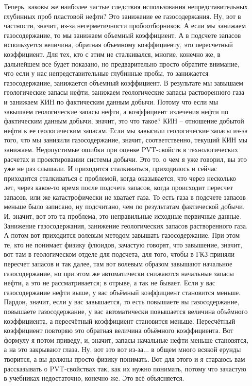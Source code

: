 \documentclass[main.tex]{subfiles}
\begin{document}
Теперь, каковы же наиболее частые следствия использования непредставительных глубинных проб пластовой нефти?
Это занижение ее газосодержания.
Ну, вот в частности, значит, из-за негерметичности пробоотборников.
А если мы занижаем газосодержание, то мы занижаем объемный коэффициент.
А в подсчете запасов используется величина, обратная объемному коэффициенту, это пересчетный коэффициент.
Для тех, кто с этим не сталкивался, многие, конечно же, в дальнейшем все будет показано, но предварительно просто обратите внимание, что если у нас непредставительные глубинные пробы, то занижается газосодержание, занижается объемный коэффициент.
В результате мы завышаем геологические запасы нефти, занижаем геологические запасы растворенного газа и занижаем КИН по фактическим данным добычи.
Потому что если мы завышаем геологические запасы нефти, а коэффициент излечения нефти по фактическим данным добычи, значит, это что такое?
КИН -- отношение добытой нефти к ее геологическим запасам.
Если мы завысили геологические запасы из-за того, что мы занизили газосодержание, значит, соответственно, текущий КИН мы занижаем.
Недопустимые ошибки при оценке PVT-свойств в технологических расчетах и проектировании системы добычи.
Это то, о чем я уже говорил, вы это уже не раз слышали.
И приходится сталкиваться, приходилось и сейчас приходится сталкиваться с проблемой, когда оказывается, что через несколько лет, через какое-то время после подсчета запасов, когда происходит пересчет запасов, или же катастрофически не хватает газа.
То есть газа в подсчете запасов меньше было записано, ну подсчитано, чем по результатам фактической добычи.
И, значит, вот это та проблема, это неправильные исходные первичные данные.
Занижение газосодержания, занижение геологических запасов растворенного газа.
А потом вот приходится волевым методом завышать газосодержание.
При этом те, кто не понимает физику флюидов, зачастую говорят, что завышение, значит, вот там в геологическом отделе для подсчета, для того, чтобы в ГКЗ приняли пересчет запасов и так далее, там вот волевым образом завышают начальное газосодержание, но при этом же автоматически снижаются начальные запасы нефти, а это не рассматривается; в отрыве, а так не бывает.
Если у вас газосодержание нефти выше, у вас объёмный коэффициент становится меньше.
Пардон, значит, если у вас завышается, то есть повышаете вы газосодержание, повышаете газосодержание, у вас автоматически повышается величина объёмного коэффициента, а пересчётный коэффициент становится меньше.
Пересчётный коэффициент повторяю это обратная величина объёмного коэффициента.
Вот формулу я потом приведу, и, значит, запасы начальные нефти меньше становятся, а на это закрывают глаза.
Ну, вот это вот из-за... в общем много всякой ерунды творится, а вы должны просто физику понимать.
Вот для этого и я стараюсь вам рассказывать о PVT-свойствах так, как их нужно понимать, потому что зачастую в учебниках недостаточно, конечно же.
Это всё объясняется.
\end{document}
